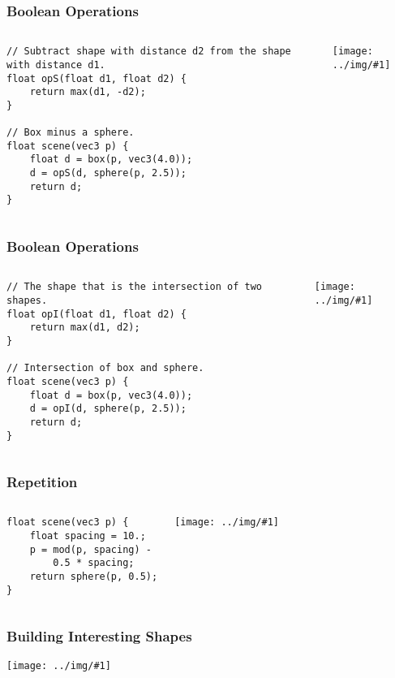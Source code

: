 \documentclass{beamer}
\newcommand\graphic[1]{\texttt{[image: ../img/\#1]}}
\begin{document}
\begin{frame}[fragile]
    \frametitle{Boolean Operations}
    \begin{columns}
        \begin{verbatim}
// Subtract shape with distance d2 from the shape with distance d1.
float opS(float d1, float d2) {
    return max(d1, -d2);
}

// Box minus a sphere.
float scene(vec3 p) {
    float d = box(p, vec3(4.0));
    d = opS(d, sphere(p, 2.5));
    return d;
}
        \end{verbatim}
        \graphic{box-minus-sphere.png}
    \end{columns}
\end{frame}

\begin{frame}[fragile]
    \frametitle{Boolean Operations}
    \begin{columns}
        \begin{verbatim}
// The shape that is the intersection of two shapes.
float opI(float d1, float d2) {
    return max(d1, d2);
}

// Intersection of box and sphere.
float scene(vec3 p) {
    float d = box(p, vec3(4.0));
    d = opI(d, sphere(p, 2.5));
    return d;
}
        \end{verbatim}
        \graphic{box-intersect-sphere.png}
    \end{columns}
\end{frame}

\begin{frame}[fragile]
    \frametitle{Repetition}
    \begin{columns}
        \begin{verbatim}
float scene(vec3 p) {
    float spacing = 10.;
    p = mod(p, spacing) -
        0.5 * spacing;
    return sphere(p, 0.5);
}
        \end{verbatim}
        \graphic{infinite-spheres.png}
    \end{columns}
\end{frame}

\begin{frame}[fragile]
    \frametitle{Building Interesting Shapes}
    \graphic{building-interesting-shapes.png}
\end{frame}
\end{document}
